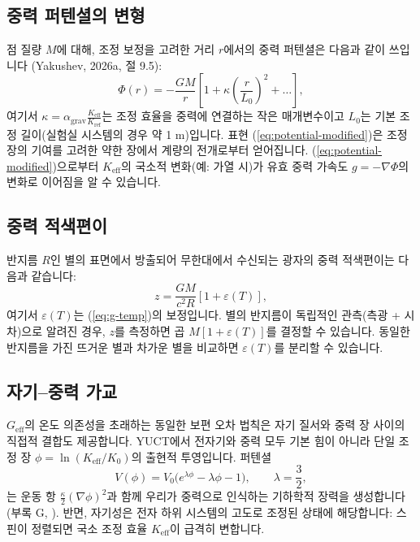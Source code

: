\documentclass[11pt,a4paper]{article}
\newcommand{\Keff}{K_{\mathrm{eff}}}
\newcommand{\eps}{\varepsilon}
\begin{document}
	\subsection{중력 퍼텐셜의 변형}
	\label{subsec:potential}
	
	점 질량 $M$에 대해, 조정 보정을 고려한 거리 $r$에서의 중력 퍼텐셜은 다음과 같이 쓰입니다 (Yakushev, 2026a, 절 9.5):
	\begin{equation}
		\Phi(r) = -\frac{GM}{r} \left[ 1 + \kappa \left( \frac{r}{L_0} \right)^2 + \dots \right],
		\label{eq:potential-modified}
	\end{equation}
	여기서 $\kappa = \alpha_{\text{grav}} \frac{\Keff}{K_{\text{ref}}}$는 조정 효율을 중력에 연결하는 작은 매개변수이고 $L_0$는 기본 조정 길이(실험실 시스템의 경우 약 1 m)입니다. 표현 (\ref{eq:potential-modified})은 조정 장의 기여를 고려한 약한 장에서 계량의 전개로부터 얻어집니다. (\ref{eq:potential-modified})으로부터 $\Keff$의 국소적 변화(예: 가열 시)가 유효 중력 가속도 $g = -\nabla \Phi$의 변화로 이어짐을 알 수 있습니다.
	
	\subsection{중력 적색편이}
	\label{subsec:redshift}
	
	반지름 $R$인 별의 표면에서 방출되어 무한대에서 수신되는 광자의 중력 적색편이는 다음과 같습니다:
	\begin{equation}
		z = \frac{GM}{c^2 R} \left[ 1 + \eps(T) \right],
		\label{eq:redshift}
	\end{equation}
	여기서 $\eps(T)$는 (\ref{eq:g-temp})의 보정입니다. 별의 반지름이 독립적인 관측(측광 + 시차)으로 알려진 경우, $z$를 측정하면 곱 $M[1+\eps(T)]$를 결정할 수 있습니다. 동일한 반지름을 가진 뜨거운 별과 차가운 별을 비교하면 $\eps(T)$를 분리할 수 있습니다.
	
	\subsection{자기–중력 가교}
	\label{subsec:magnetism-gravity}
	
	$G_{\mathrm{eff}}$의 온도 의존성을 초래하는 동일한 보편 오차 법칙은 자기 질서와 중력 장 사이의 직접적 결합도 제공합니다. YUCT에서 전자기와 중력 모두 기본 힘이 아니라 단일 조정 장 $\phi = \ln(\Keff/K_0)$의 출현적 투영입니다. 퍼텐셜
	\begin{equation}
		V(\phi) = V_0\bigl(e^{\lambda\phi} - \lambda\phi - 1\bigr), \qquad \lambda = \frac{3}{2},
	\end{equation}
	는 운동 항 $\frac{\kappa}{2}(\nabla\phi)^2$과 함께 우리가 중력으로 인식하는 기하학적 장력을 생성합니다 (부록 G, \cite{AppendixG}). 반면, 자기성은 전자 하위 시스템의 고도로 조정된 상태에 해당합니다: 스핀이 정렬되면 국소 조정 효율 $\Keff$이 급격히 변합니다.
	
\end{document}
